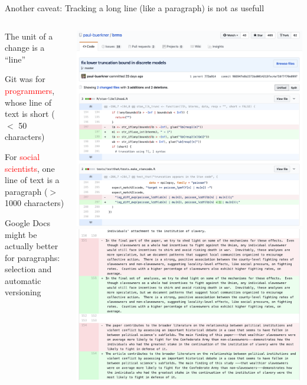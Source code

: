 \documentclass[ignorenonframetext, 10pt, aspectratio=169]{beamer}
\begin{document}
\begin{frame}{Another caveat: Tracking a long line (like a paragraph) is not as usefull}
\begin{columns}[T]
\begin{column}{0.4\textwidth}
\begin{wideitemize}
\item<1-> The unit of a change is a ``line''
\item<1-> Git was for \textcolor{red}{programmers}, whose line of text is short ($<$ 50 characters)
\item<2-> For \textcolor{red}{social scientists}, one line of text is a paragraph ($>$ 1000 characters)
\item<3-> Google Docs might be actually better for paragraphs: selection and automatic versioning
\end{wideitemize}
\end{column}
\begin{column}{0.6\textwidth}
\begin{overprint}
\includegraphics[width = \linewidth]{software-dev-diff.png}
\includegraphics[width = \linewidth]{long-diff-2.png}

\end{overprint}
\end{column}
\end{columns}
\end{frame}
\end{document}
